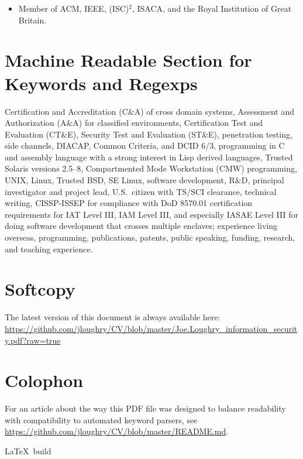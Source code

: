 \documentclass[12pt,letterpaper]{article}
\begin{document}
\begin{itemize}
	\item Member of ACM, IEEE, (ISC)$^2$, ISACA, and the Royal Institution of Great Britain.
\end{itemize}

\section*{Machine Readable Section for Keywords and Regexps}

Certification and Accreditation (C\&A) of cross domain systems,
Assessment and Authorization (A\&A) for classified environments,
Certification Test and Evaluation (CT\&E), Security Test and Evaluation (ST\&E),
penetration testing, side channels,
DIACAP, Common Criteria, and DCID 6/3,
programming in C and assembly language with a strong interest in Lisp derived languages,
Trusted Solaris versions 2.5--8, Compartmented Mode Workstation (CMW) programming,
UNIX, Linux, Trusted BSD, SE Linux,
software development,
R\&D,
principal investigator and project lead,
U.S.\ citizen with TS/SCI clearance,
technical writing,
CISSP-ISSEP for compliance with DoD 8570.01 certification requirements for IAT Level III,
	IAM Level III, and especially IASAE Level III for doing software development that crosses
	multiple enclaves;
experience living overseas,
programming,
publications,
patents,
public speaking,
funding,
research,
and teaching experience.

\section*{Softcopy}

The latest version of this document is always available here:
\url{https://github.com/jloughry/CV/blob/master/Joe.Loughry_information_security.pdf?raw=true}

\section*{Colophon}

For an article about the way this PDF file was designed to balance readability with compatibility
to automated keyword parsers, see \url{https://github.com/jloughry/CV/blob/master/README.md}.

\vfill
{\tiny \LaTeX\ build }
\end{document}
